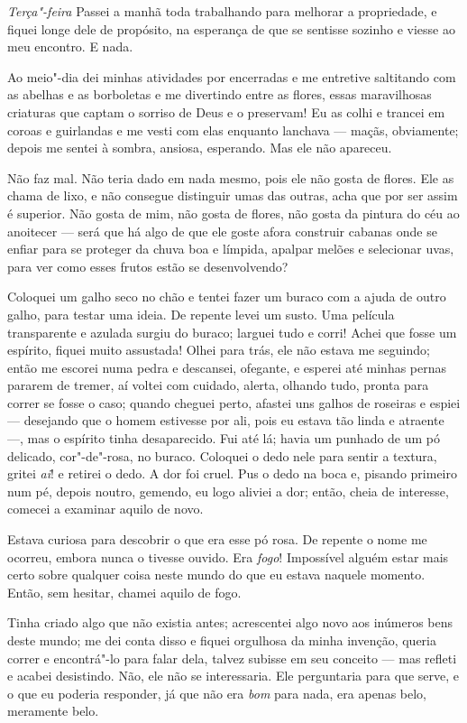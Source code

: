 \textit{Terça"-feira} Passei a manhã toda trabalhando para melhorar a propriedade, e
fiquei longe dele de propósito, na esperança de que se sentisse sozinho e
viesse ao meu encontro. E nada.

Ao meio"-dia dei minhas atividades por encerradas e me entretive saltitando
com as abelhas e as borboletas e me divertindo entre as flores,
essas maravilhosas criaturas que captam o sorriso de Deus e o preservam! Eu as
colhi e trancei em coroas e guirlandas e me vesti com elas enquanto lanchava
--- maçãs, obviamente; depois me sentei à sombra, ansiosa, esperando. Mas ele não
apareceu.

Não faz mal. Não teria dado em nada mesmo, pois ele não gosta de
flores. Ele as chama de lixo, e não consegue distinguir umas das outras, acha
que por ser assim é superior. Não gosta de mim, não gosta de flores, não
gosta da pintura do céu ao anoitecer --- será que há algo de que ele
goste afora construir cabanas onde se enfiar para se proteger da chuva boa
e límpida, apalpar melões e selecionar uvas, para ver como
esses frutos estão se desenvolvendo?

Coloquei um galho seco no chão e tentei fazer um buraco com a ajuda de outro
galho, para testar uma ideia. De repente levei um susto. Uma película
transparente e azulada surgiu do buraco; larguei tudo e corri! Achei que fosse
um espírito, fiquei muito assustada! Olhei para trás, ele não estava me
seguindo; então me escorei numa pedra e descansei, ofegante, e esperei até 
minhas pernas pararem de tremer, aí voltei com cuidado, alerta, olhando tudo,
pronta para correr se fosse o caso; quando cheguei perto, afastei uns galhos
de roseiras e espiei --- desejando que o homem estivesse por ali, pois eu estava
tão linda e atraente ---, mas o espírito tinha desaparecido. Fui até lá;
havia um punhado de um pó delicado, cor"-de"-rosa, no buraco. Coloquei o dedo nele
para sentir a textura, gritei \textit{ai}! e retirei o dedo. A dor foi cruel.
Pus o dedo na boca e, pisando primeiro num pé, depois noutro, gemendo,
eu logo aliviei a dor; então, cheia de interesse, comecei a examinar
aquilo de novo.

Estava curiosa para descobrir o que era esse pó rosa. De repente o nome me
ocorreu, embora nunca o tivesse ouvido. Era \textit{fogo}! Impossível alguém
estar mais certo sobre qualquer coisa neste mundo do que eu estava naquele momento.
Então, sem hesitar, chamei aquilo de fogo.

Tinha criado algo que não existia antes; acrescentei algo novo aos inúmeros
bens deste mundo; me dei conta disso e fiquei orgulhosa da minha invenção,
queria correr e encontrá"-lo para falar dela, talvez subisse em seu conceito
--- mas refleti e acabei desistindo. Não, ele não se interessaria. Ele perguntaria
para que serve, e o que eu poderia responder, já que não era \textit{bom}
para nada, era apenas belo, meramente belo.

